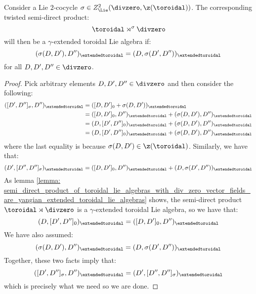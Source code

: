         \begin{proposition} \label{proposition: twisted_semi_direct_products_are_yangian_extended_toroidal_lie_algebras}
            Consider a Lie $2$-cocycle $\sigma \in Z^2_{\Lie}(\divzero, \z(\toroidal))$. The corresponding twisted semi-direct product:
                $$\toroidal \rtimes^{\sigma} \divzero$$
            will then be a $\gamma$-extended toroidal Lie algebra if:
                $$(\sigma(D, D'), D'')_{\extendedtoroidal} = (D, \sigma(D', D''))_{\extendedtoroidal}$$
            for all $D, D', D'' \in \divzero$.
        \end{proposition}
            \begin{proof}
                Pick arbitrary elements $D, D', D'' \in \divzero$ and then consider the following:
                    $$
                        \begin{aligned}
                            ([D', D'']_{\sigma}, D'')_{\extendedtoroidal} & = ([D, D']_0 + \sigma(D, D'))_{\extendedtoroidal}
                            \\
                            & = ([D, D']_0, D'')_{\extendedtoroidal} + (\sigma(D, D'), D'')_{\extendedtoroidal}
                            \\
                            & = (D, [D', D'']_0)_{\extendedtoroidal} + (\sigma(D, D'), D'')_{\extendedtoroidal}
                            \\
                            & = (D, [D', D'']_0)_{\extendedtoroidal} + (\sigma(D, D'), D'')_{\extendedtoroidal}
                        \end{aligned}
                    $$
                where the last equality is because $\sigma(D, D') \in \z(\toroidal)$. Similarly, we have that:
                    $$(D', [D'', D'']_{\sigma})_{\extendedtoroidal} = ([D, D']_0, D'')_{\extendedtoroidal} + (D, \sigma(D', D''))_{\extendedtoroidal}$$
                As lemma \ref{lemma: semi_direct_product_of_toroidal_lie_algebras_with_div_zero_vector_fields_are_yangian_extended_toroidal_lie_algebras} shows, the semi-direct product $\toroidal \rtimes \divzero$ is a $\gamma$-extended toroidal Lie algebra, so we have that:
                    $$(D, [D', D'']_0)_{\extendedtoroidal} = ([D, D']_0, D'')_{\extendedtoroidal}$$
                We have also assumed:
                    $$(\sigma(D, D'), D'')_{\extendedtoroidal} = (D, \sigma(D', D''))_{\extendedtoroidal}$$
                Together, these two facts imply that:
                    $$([D', D'']_{\sigma}, D'')_{\extendedtoroidal} = (D', [D'', D'']_{\sigma})_{\extendedtoroidal}$$
                which is precisely what we need so we are done.
            \end{proof}

